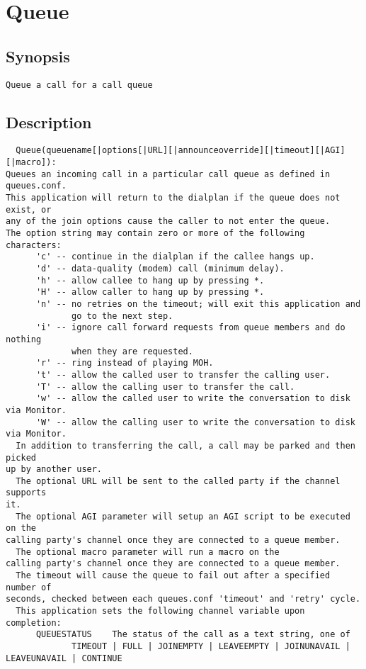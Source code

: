\section{Queue}
\subsection{Synopsis}
\begin{verbatim}
Queue a call for a call queue
\end{verbatim}
\subsection{Description}
\begin{verbatim}
  Queue(queuename[|options[|URL][|announceoverride][|timeout][|AGI][|macro]):
Queues an incoming call in a particular call queue as defined in queues.conf.
This application will return to the dialplan if the queue does not exist, or
any of the join options cause the caller to not enter the queue.
The option string may contain zero or more of the following characters:
      'c' -- continue in the dialplan if the callee hangs up.
      'd' -- data-quality (modem) call (minimum delay).
      'h' -- allow callee to hang up by pressing *.
      'H' -- allow caller to hang up by pressing *.
      'n' -- no retries on the timeout; will exit this application and 
             go to the next step.
      'i' -- ignore call forward requests from queue members and do nothing
             when they are requested.
      'r' -- ring instead of playing MOH.
      't' -- allow the called user to transfer the calling user.
      'T' -- allow the calling user to transfer the call.
      'w' -- allow the called user to write the conversation to disk via Monitor.
      'W' -- allow the calling user to write the conversation to disk via Monitor.
  In addition to transferring the call, a call may be parked and then picked
up by another user.
  The optional URL will be sent to the called party if the channel supports
it.
  The optional AGI parameter will setup an AGI script to be executed on the 
calling party's channel once they are connected to a queue member.
  The optional macro parameter will run a macro on the 
calling party's channel once they are connected to a queue member.
  The timeout will cause the queue to fail out after a specified number of
seconds, checked between each queues.conf 'timeout' and 'retry' cycle.
  This application sets the following channel variable upon completion:
      QUEUESTATUS    The status of the call as a text string, one of
             TIMEOUT | FULL | JOINEMPTY | LEAVEEMPTY | JOINUNAVAIL | LEAVEUNAVAIL | CONTINUE

\end{verbatim}


